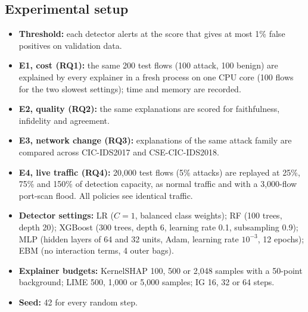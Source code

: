 \subsection{Experimental setup}
\begin{itemize}[leftmargin=*, itemsep=0pt]
  \item \textbf{Threshold:} each detector alerts at the score that gives at most 1\% false positives on validation data.
  \item \textbf{E1, cost (RQ1):} the same 200 test flows (100 attack, 100 benign) are explained by every explainer in a fresh process on one CPU core (100 flows for the two slowest settings); time and memory are recorded.
  \item \textbf{E2, quality (RQ2):} the same explanations are scored for faithfulness, infidelity and agreement.
  \item \textbf{E3, network change (RQ3):} explanations of the same attack family are compared across CIC-IDS2017 and CSE-CIC-IDS2018.
  \item \textbf{E4, live traffic (RQ4):} 20{,}000 test flows (5\% attacks) are replayed at 25\%, 75\% and 150\% of detection capacity, as normal traffic and with a 3{,}000-flow port-scan flood. All policies see identical traffic.
  \item \textbf{Detector settings:} LR ($C=1$, balanced class weights); RF (100 trees, depth 20); XGBoost (300 trees, depth 6, learning rate 0.1, subsampling 0.9); MLP (hidden layers of 64 and 32 units, Adam, learning rate $10^{-3}$, 12 epochs); EBM (no interaction terms, 4 outer bags).
  \item \textbf{Explainer budgets:} KernelSHAP 100, 500 or 2{,}048 samples with a 50-point background; LIME 500, 1{,}000 or 5{,}000 samples; IG 16, 32 or 64 steps.
  \item \textbf{Seed:} 42 for every random step.
\end{itemize}
